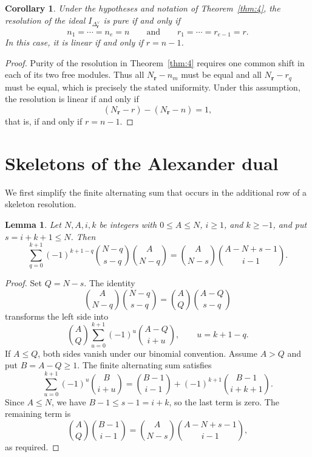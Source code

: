 \documentclass[11pt]{amsart}
\newtheorem{corollary}[theorem]{Corollary}
\newtheorem{lemma}[theorem]{Lemma}
\theoremstyle{definition}
\theoremstyle{remark}
\begin{document}
	\begin{corollary}\label{cor:12}
		Under the hypotheses and notation of Theorem~\ref{thm:4}, the resolution of the ideal $I_{\Delta_{\mathbf r}^\vee}$ is pure if and only if
		\[
		n_1=\cdots=n_e=n
		\qquad\text{and}\qquad
		r_1=\cdots=r_{e-1}=r.
		\]
		In this case, it is linear if and only if $r=n-1$.
	\end{corollary}
	
	\begin{proof}
		Purity of the resolution in Theorem~\ref{thm:4} requires one common shift in each of its two free modules. Thus all $N_{\mathbf r}-n_m$ must be equal and all $N_{\mathbf r}-r_q$ must be equal, which is precisely the stated uniformity. Under this assumption, the resolution is linear if and only if
		\[
		(N_{\mathbf r}-r)-(N_{\mathbf r}-n)=1,
		\]
		that is, if and only if $r=n-1$.
	\end{proof}
	
	\section{Skeletons of the Alexander dual}\label{sec:6}
	
	We first simplify the finite alternating sum that occurs in the additional row of a skeleton resolution.
	
	\begin{lemma}\label{lem:2}
		Let $N,A,i,k$ be integers with $0\le A\le N$, $i\ge1$, and $k\ge-1$, and put $s=i+k+1\le N$. Then
		\[
		\sum_{q=0}^{k+1}(-1)^{k+1-q}
		\binom{N-q}{s-q}
		\binom{A}{N-q}
		=
		\binom{A}{N-s}
		\binom{A-N+s-1}{i-1}.
		\]
	\end{lemma}
	
	\begin{proof}
		Set $Q=N-s$. The identity
		\[
		\binom{A}{N-q}\binom{N-q}{s-q}
		=
		\binom AQ\binom{A-Q}{s-q}
		\]
		transforms the left side into
		\[
		\binom AQ\sum_{u=0}^{k+1}(-1)^u\binom{A-Q}{i+u},
		\qquad u=k+1-q.
		\]
		If $A\le Q$, both sides vanish under our binomial convention. Assume $A>Q$ and put $B=A-Q\ge1$. The finite alternating sum satisfies
		\[
		\sum_{u=0}^{k+1}(-1)^u\binom B{i+u}
		=
		\binom{B-1}{i-1}+(-1)^{k+1}\binom{B-1}{i+k+1}.
		\]
		Since $A\le N$, we have $B-1\le s-1=i+k$, so the last term is zero. The remaining term is
		\[
		\binom AQ\binom{B-1}{i-1}
		=
		\binom{A}{N-s}
		\binom{A-N+s-1}{i-1},
		\]
		as required.
	\end{proof}
	
\end{document}

